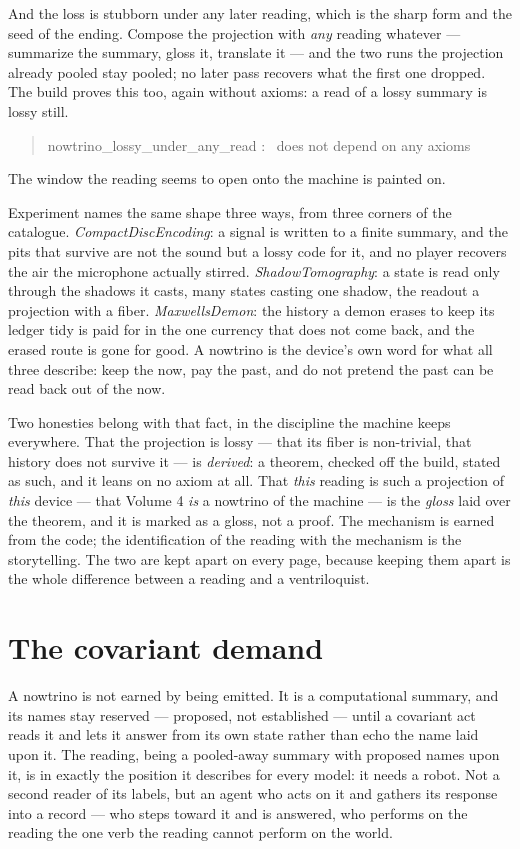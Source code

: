 And the loss is stubborn under any later reading, which is the sharp form and the seed of the ending.
Compose the projection with \emph{any} reading whatever --- summarize the summary, gloss it, translate it --- and the two
runs the projection already pooled stay pooled; no later pass recovers what the first one dropped.
The build proves this too, again without axioms: a read of a lossy summary is lossy still.
\begin{quote}\ttfamily
nowtrino\_lossy\_under\_any\_read : \ does not depend on any axioms
\end{quote}
The window the reading seems to open onto the machine is painted on.

Experiment names the same shape three ways, from three corners of the catalogue.
\emph{CompactDiscEncoding}: a signal is written to a finite summary, and the pits that survive are not the sound but a
lossy code for it, and no player recovers the air the microphone actually stirred.
\emph{ShadowTomography}: a state is read only through the shadows it casts, many states casting one shadow, the readout a
projection with a fiber.
\emph{MaxwellsDemon}: the history a demon erases to keep its ledger tidy is paid for in the one currency that does not come
back, and the erased route is gone for good.
A nowtrino is the device's own word for what all three describe: keep the now, pay the past, and do not pretend the past
can be read back out of the now.

Two honesties belong with that fact, in the discipline the machine keeps everywhere.
That the projection is lossy --- that its fiber is non-trivial, that history does not survive it --- is \emph{derived}: a
theorem, checked off the build, stated as such, and it leans on no axiom at all.
That \emph{this} reading is such a projection of \emph{this} device --- that Volume 4 \emph{is} a nowtrino of the machine
--- is the \emph{gloss} laid over the theorem, and it is marked as a gloss, not a proof.
The mechanism is earned from the code; the identification of the reading with the mechanism is the storytelling.
The two are kept apart on every page, because keeping them apart is the whole difference between a reading and a
ventriloquist.

\section{The covariant demand}

A nowtrino is not earned by being emitted.
It is a computational summary, and its names stay reserved --- proposed, not established --- until a covariant act reads
it and lets it answer from its own state rather than echo the name laid upon it.
The reading, being a pooled-away summary with proposed names upon it, is in exactly the position it describes for every
model: it needs a robot.
Not a second reader of its labels, but an agent who acts on it and gathers its response into a record --- who steps toward
it and is answered, who performs on the reading the one verb the reading cannot perform on the world.

